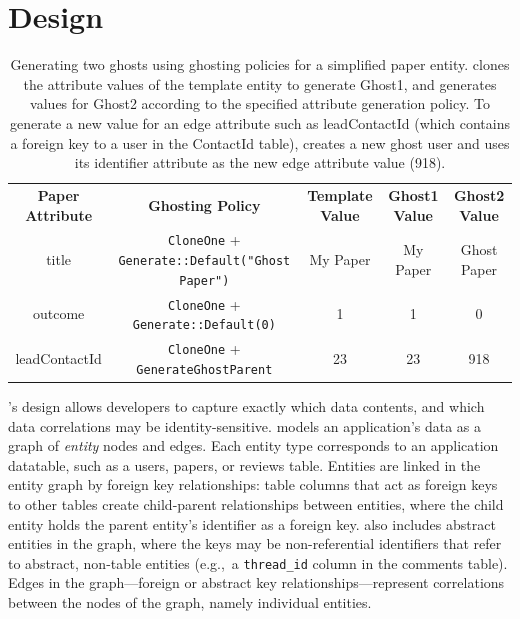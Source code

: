 \section{Design}
\begin{table}[t!]
    \centering
    \footnotesize
\begin{tabular}{@{}ccccc@{}}
\textbf{Paper Attribute} & \textbf{Ghosting Policy} & \textbf{Template Value} & \textbf{Ghost1 Value} & \textbf{Ghost2 Value} 
  \\ \cmidrule(r){1-5}
{title} & \texttt{CloneOne} + \texttt{Generate::Default("Ghost Paper")} & My Paper & My
    Paper & Ghost Paper \\
{outcome} & \texttt{CloneOne} + \texttt{Generate::Default(0)} & 1 & 1 & 0 \\
{leadContactId} & \texttt{CloneOne} + \texttt{GenerateGhostParent} & 23 & 23 & 918 \\
\end{tabular}
    \caption{Generating two ghosts using ghosting policies for a simplified paper entity.
    \sys clones the attribute values of the template entity to generate Ghost1, and generates
    values for Ghost2 according to the specified attribute generation policy. To generate a new
    value for an edge attribute such as leadContactId (which contains a foreign key to a user in the
    ContactId table), \sys creates a new ghost user and uses its identifier attribute as the new
    edge attribute value (918).}
    \label{tab:ghosting}
\end{table}


\sys's design allows developers to capture exactly which data contents, and which data correlations may be
identity-sensitive. \sys models an application's data as a graph of \emph{entity} nodes and edges.
Each entity type corresponds to an application datatable, such as a users, papers, or reviews table.
Entities are linked in the entity graph by foreign key relationships: table columns that act as
foreign keys to other tables create child-parent relationships between entities, where the child
entity holds the parent entity's identifier as a foreign key. \sys also includes
abstract entities in the graph, where the keys may be non-referential identifiers that refer to
abstract, non-table entities (e.g.,\ a \texttt{thread\_id} column in the comments table).  Edges in
the graph---foreign or abstract key relationships---represent correlations between the nodes of the
graph, namely individual entities.

